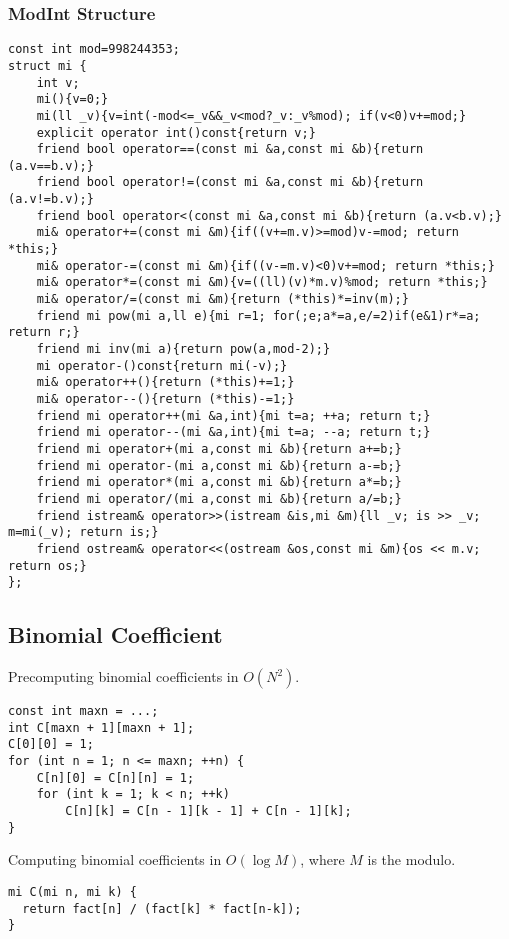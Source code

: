 \newpage

\subsubsection{ModInt Structure}

\begin{lstlisting}
const int mod=998244353;
struct mi {
    int v;
    mi(){v=0;}
    mi(ll _v){v=int(-mod<=_v&&_v<mod?_v:_v%mod); if(v<0)v+=mod;}
    explicit operator int()const{return v;}
    friend bool operator==(const mi &a,const mi &b){return (a.v==b.v);}
    friend bool operator!=(const mi &a,const mi &b){return (a.v!=b.v);}
    friend bool operator<(const mi &a,const mi &b){return (a.v<b.v);}
    mi& operator+=(const mi &m){if((v+=m.v)>=mod)v-=mod; return *this;}
    mi& operator-=(const mi &m){if((v-=m.v)<0)v+=mod; return *this;}
    mi& operator*=(const mi &m){v=((ll)(v)*m.v)%mod; return *this;}
    mi& operator/=(const mi &m){return (*this)*=inv(m);}
    friend mi pow(mi a,ll e){mi r=1; for(;e;a*=a,e/=2)if(e&1)r*=a; return r;}
    friend mi inv(mi a){return pow(a,mod-2);}
    mi operator-()const{return mi(-v);}
    mi& operator++(){return (*this)+=1;}
    mi& operator--(){return (*this)-=1;}
    friend mi operator++(mi &a,int){mi t=a; ++a; return t;}
    friend mi operator--(mi &a,int){mi t=a; --a; return t;}
    friend mi operator+(mi a,const mi &b){return a+=b;}
    friend mi operator-(mi a,const mi &b){return a-=b;}
    friend mi operator*(mi a,const mi &b){return a*=b;}
    friend mi operator/(mi a,const mi &b){return a/=b;}
    friend istream& operator>>(istream &is,mi &m){ll _v; is >> _v; m=mi(_v); return is;}
    friend ostream& operator<<(ostream &os,const mi &m){os << m.v; return os;}
};
\end{lstlisting}

\subsection{Binomial Coefficient}

Precomputing binomial coefficients in $O(N^2)$.
\begin{lstlisting}
const int maxn = ...;
int C[maxn + 1][maxn + 1];
C[0][0] = 1;
for (int n = 1; n <= maxn; ++n) {
    C[n][0] = C[n][n] = 1;
    for (int k = 1; k < n; ++k)
        C[n][k] = C[n - 1][k - 1] + C[n - 1][k];
}
\end{lstlisting}

Computing binomial coefficients in $O(\log M)$, where $M$ is the modulo.
\begin{lstlisting}
mi C(mi n, mi k) {
  return fact[n] / (fact[k] * fact[n-k]);
}
\end{lstlisting}


